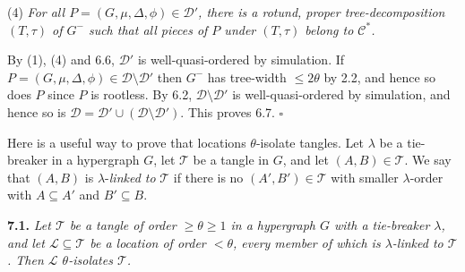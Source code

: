 \hspace*{12pt}(4) \textit{For all $P = (G, \mu, \Delta, \phi) \in \mathscr{D}'$, there is a rotund, proper tree-decomposition $(T, \tau)$ of $G^-$ such that all pieces of $P$ under $(T, \tau)$ belong to $\mathscr{C}^*$.}

By (1), (4) and 6.6, $\mathscr{D}'$ is well-quasi-ordered by simulation. If $P = (G, \mu, \Delta, \phi) \in \mathscr{D} \setminus \mathscr{D}'$ then $G^-$ has tree-width $\le 2\theta$ by 2.2, and hence so does $P$ since $P$ is rootless. By 6.2, $\mathscr{D} \setminus \mathscr{D}'$ is well-quasi-ordered by simulation, and hence so is $\mathscr{D} = \mathscr{D}' \cup (\mathscr{D} \setminus \mathscr{D}')$. This proves 6.7. $\square$


Here is a useful way to prove that locations $\theta$-isolate tangles. Let $\lambda$ be a tie-breaker in a hypergraph $G$, let $\mathscr{T}$ be a tangle in $G$, and let $(A, B) \in \mathscr{T}$. We say that $(A, B)$ is $\lambda$-\textit{linked to} $\mathscr{T}$ if there is no $(A', B') \in \mathscr{T}$ with smaller $\lambda$-order with $A \subseteq A'$ and $B' \subseteq B$.

\textbf{7.1.} \textit{Let $\mathscr{T}$ be a tangle of order $\ge \theta \ge 1$ in a hypergraph $G$ with a tie-breaker $\lambda$, and let $\mathscr{L} \subseteq \mathscr{T}$ be a location of order $< \theta$, every member of which is $\lambda$-linked to $\mathscr{T}$. Then $\mathscr{L}$ $\theta$-isolates $\mathscr{T}$.}
